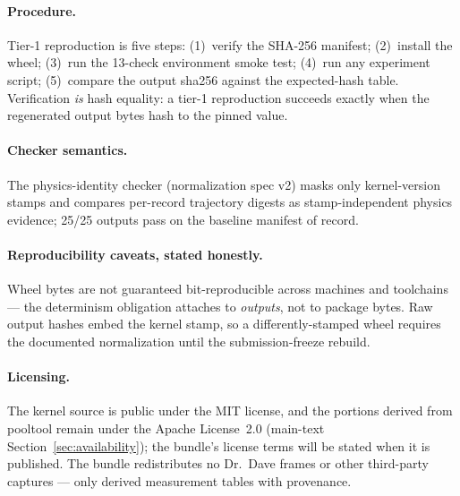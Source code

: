 \paragraph{Procedure.}
Tier-1 reproduction is five steps: (1)~verify the SHA-256 manifest;
(2)~install the wheel; (3)~run the 13-check environment smoke test;
(4)~run any experiment script; (5)~compare the output sha256 against the
expected-hash table. Verification \emph{is} hash equality: a tier-1
reproduction succeeds exactly when the regenerated output bytes hash to
the pinned value.

\paragraph{Checker semantics.}
The physics-identity checker (normalization spec v2)
masks only kernel-version stamps and compares per-record trajectory
digests as stamp-independent physics evidence; 25/25 outputs pass on the
baseline manifest of record.

\paragraph{Reproducibility caveats, stated honestly.}
Wheel bytes are not guaranteed bit-reproducible across machines and
toolchains --- the determinism obligation attaches to \emph{outputs}, not
to package bytes. Raw output hashes embed the kernel stamp, so a
differently-stamped wheel requires the documented normalization until the
submission-freeze rebuild.

\paragraph{Licensing.}
The kernel source is public under the MIT license, and the portions
derived from pooltool remain under the Apache License~2.0 (main-text
Section~\ref{sec:availability}); the bundle's license terms will be
stated when it is published. The bundle redistributes no Dr.~Dave
frames or other third-party captures --- only derived measurement
tables with provenance.
